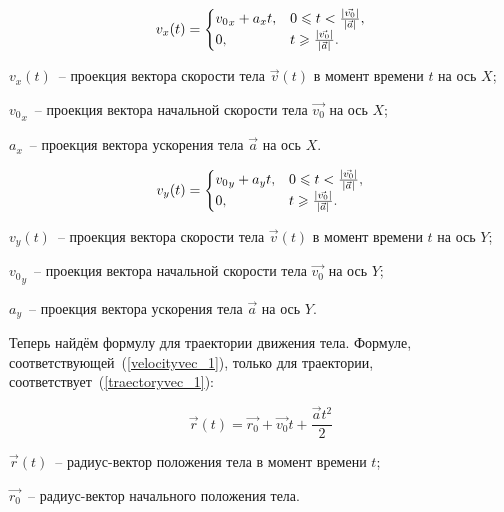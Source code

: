 \begin{equation}\label{v_x_1}
  v_x(t) =
  \begin{cases}
    {v_0}_x + a_x t, & 0 \leqslant t < \frac{\left|\vec{v_0}\right|}{\left|\vec{a}\right|}, \\
    0,               & t \geqslant \frac{\left|\vec{v_0}\right|}{\left|\vec{a}\right|}.
  \end{cases}
\end{equation}

\begin{Underequation}
  \(v_x(t)\)~-- проекция вектора скорости тела \(\vec{v}(t)\) в момент времени \(t\) на ось \(X\);

  \({v_0}_x\)~-- проекция вектора начальной скорости тела \(\vec{v_0}\) на ось \(X\);

  \(a_x\)~-- проекция вектора ускорения тела \(\vec{a}\) на ось \(X\).
\end{Underequation}

\begin{equation}\label{v_y_1}
  v_y(t) =
  \begin{cases}
    {v_0}_y + a_y t, & 0  \leqslant t < \frac{\left|\vec{v_0}\right|}{\left|\vec{a}\right|}, \\
    0,               & t \geqslant \frac{\left|\vec{v_0}\right|}{\left|\vec{a}\right|}.
  \end{cases}
\end{equation}

\begin{Underequation}
  \(v_y(t)\)~-- проекция вектора скорости тела \(\vec{v}(t)\) в момент времени \(t\) на ось \(Y\);

  \({v_0}_y\)~-- проекция вектора начальной скорости тела \(\vec{v_0}\) на ось \(Y\);

  \(a_y\)~-- проекция вектора ускорения тела \(\vec{a}\) на ось \(Y\).
\end{Underequation}

Теперь найдём формулу для траектории движения тела. Формуле, соответствующей~(\ref{velocityvec_1}),
только для траектории, соответствует~(\ref{traectoryvec_1}):

\begin{equation}\label{traectoryvec_1}
  \vec{r}(t) = \vec{r_0} + \vec{v_0}t + \frac{\vec{a}t^2}{2}
\end{equation}

\begin{Underequation}
  \(\vec{r}(t)\)~-- радиус-вектор положения тела в момент времени \(t\);

  \(\vec{r_0}\)~-- радиус-вектор начального положения тела.
\end{Underequation}

